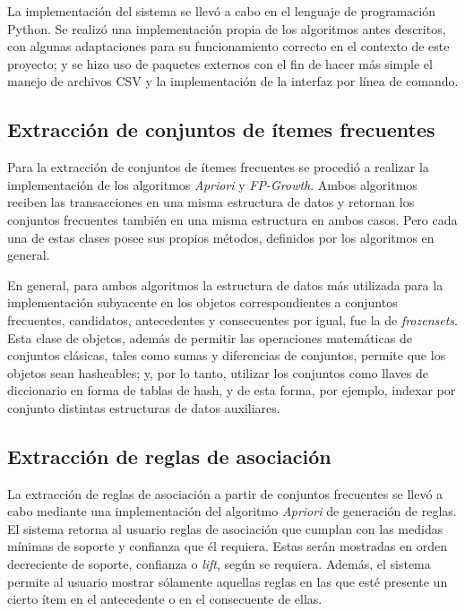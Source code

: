 La implementación del sistema se llevó a cabo en el lenguaje de programación Python\cite{python.org}. Se realizó una implementación propia de los algoritmos antes descritos, con algunas adaptaciones para su funcionamiento correcto en el contexto de este proyecto; y se hizo uso de paquetes externos con el fin de hacer más simple el manejo de archivos CSV y la implementación de la interfaz por línea de comando.

\subsection{Extracción de conjuntos de ítemes frecuentes}

Para la extracción de conjuntos de ítemes frecuentes se procedió a realizar la implementación de los algoritmos \textit{Apriori} y \textit{FP-Growth}. Ambos algoritmos reciben las transacciones en una misma estructura de datos y retornan los conjuntos frecuentes también en una misma estructura en ambos casos. Pero cada una de estas clases posee sus propios métodos, definidos por los algoritmos en general.

En general, para ambos algoritmos la estructura de datos más utilizada para la implementación subyacente en los objetos correspondientes a conjuntos frecuentes, candidatos, antecedentes y consecuentes por igual, fue la de \textit{frozensets}. Esta clase de objetos, además de permitir las operaciones matemáticas de conjuntos clásicas, tales como sumas y diferencias de conjuntos, permite que los objetos sean hasheables; y, por lo tanto, utilizar los conjuntos como llaves de diccionario en forma de tablas de hash, y de esta forma, por ejemplo, indexar por conjunto distintas estructuras de datos auxiliares.

\subsection{Extracción de reglas de asociación}

La extracción de reglas de asociación a partir de conjuntos frecuentes se llevó a cabo mediante una implementación del algoritmo \textit{Apriori} de generación de reglas. El sistema retorna al usuario reglas de asociación que cumplan con las medidas mínimas de soporte y confianza que él requiera. Estas serán mostradas en orden decreciente de soporte, confianza o \textit{lift}, según se requiera. Además, el sistema permite al usuario mostrar sólamente aquellas reglas en las que esté presente un cierto ítem en el antecedente o en el consecuente de ellas.

